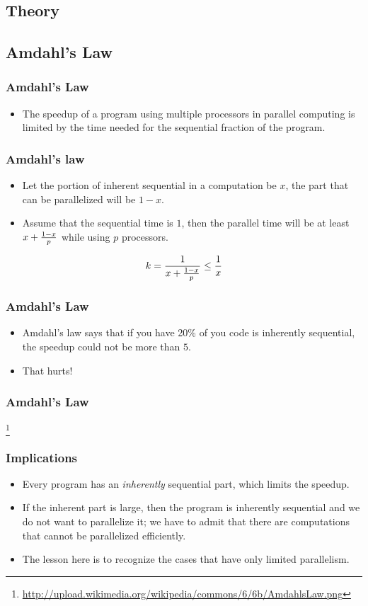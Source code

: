 \documentclass{beamer}
\begin{document}
\begin{CJK}{UTF8}{bsmi}
\section{Theory}

\subsection{Amdahl's Law}

\begin{frame}
\frametitle{Amdahl's Law} 
\begin{itemize}
\item The speedup of a program using multiple processors in parallel
  computing is limited by the time needed for the sequential fraction
  of the program.
\end{itemize}
\end{frame}

\begin{frame}
\frametitle{Amdahl's law} 
\begin{itemize}
\item Let the portion of inherent sequential in a computation be $x$,
  the part that can be parallelized will be $1 - x$.
\item Assume that the sequential time is $1$, then the parallel time
  will be at least $x + {{1-x} \over p}$ while using $p$ processors.
\end{itemize}

\begin{equation}
k = {1 \over {x + {{1-x} \over p}}} \leq {1 \over x}
\end{equation}
\end{frame}

\begin{frame}
\frametitle{Amdahl's Law} 
\begin{itemize}
\item Amdahl's law says that if you have 20\% of you code is
  inherently sequential, the speedup could not be more than $5$.
\item That hurts!
\end{itemize}
\end{frame}

\begin{frame}
\frametitle{Amdahl's Law} 
\centerline{}
\footnote{\url{http://upload.wikimedia.org/wikipedia/commons/6/6b/AmdahlsLaw.png}}
\end{frame}

\begin{frame}
\frametitle{Implications}
\begin{itemize}
\item Every program has an {\em inherently} sequential part, which
  limits the speedup.
\item If the inherent part is large, then the program is inherently
  sequential and we do not want to parallelize it; we have to admit
  that there are computations that cannot be parallelized efficiently.
\item The lesson here is to recognize the cases that have only limited
  parallelism.
\end{itemize}
\end{frame}


\end{CJK}
\end{document}
